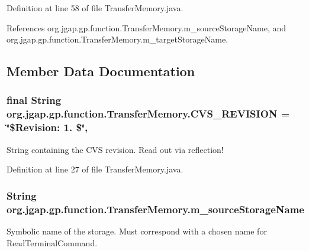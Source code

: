 Definition at line 58 of file Transfer\-Memory.\-java.



References org.\-jgap.\-gp.\-function.\-Transfer\-Memory.\-m\-\_\-source\-Storage\-Name, and org.\-jgap.\-gp.\-function.\-Transfer\-Memory.\-m\-\_\-target\-Storage\-Name.



\subsection{Member Data Documentation}
\hypertarget{classorg_1_1jgap_1_1gp_1_1function_1_1_transfer_memory_a1632c0100cc667cb5e87a459977f05ea}{
\subsubsection[{C\-V\-S\-\_\-\-R\-E\-V\-I\-S\-I\-O\-N}]{\setlength{\rightskip}{0pt plus 5cm}final String org.\-jgap.\-gp.\-function.\-Transfer\-Memory.\-C\-V\-S\-\_\-\-R\-E\-V\-I\-S\-I\-O\-N = \char`\"{}\$Revision\-: 1. \$\char`\"{}\hspace{0.3cm}{\ttfamily [static]}, {\ttfamily [private]}}}\label{classorg_1_1jgap_1_1gp_1_1function_1_1_transfer_memory_a1632c0100cc667cb5e87a459977f05ea}
String containing the C\-V\-S revision. Read out via reflection! 

Definition at line 27 of file Transfer\-Memory.\-java.

\hypertarget{classorg_1_1jgap_1_1gp_1_1function_1_1_transfer_memory_ab71c4cbe9188be6de47440940b82658f}{
\subsubsection[{m\-\_\-source\-Storage\-Name}]{\setlength{\rightskip}{0pt plus 5cm}String org.\-jgap.\-gp.\-function.\-Transfer\-Memory.\-m\-\_\-source\-Storage\-Name\hspace{0.3cm}{\ttfamily [private]}}}\label{classorg_1_1jgap_1_1gp_1_1function_1_1_transfer_memory_ab71c4cbe9188be6de47440940b82658f}
Symbolic name of the storage. Must correspond with a chosen name for Read\-Terminal\-Command. 

